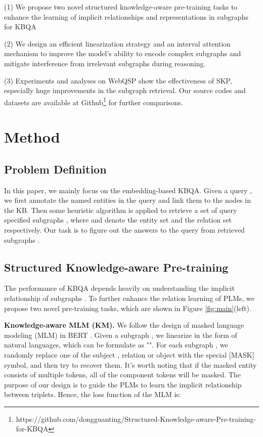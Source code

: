 \documentclass[sigconf,natbib=true,anonymous=False]{acmart}
\begin{document}
(1) We propose two novel structured knowledge-aware pre-training tasks to enhance the learning of implicit relationships and representations in subgraphs for KBQA

(2) We design an efficient linearization strategy and an interval attention mechanism to improve the model's ability to encode complex subgraphs and mitigate interference from irrelevant subgraphs during reasoning.

(3) Experiments and analyses on WebQSP show the effectiveness of SKP, especially huge improvements in the subgraph retrieval. Our source codes and datasets are available at Github\footnote{https://github.com/dongguanting/Structured-Knowledge-aware-Pre-training-for-KBQA} for further comparisons.









\section{Method}
\subsection{Problem Definition}
In this paper, we mainly focus on the embedding-based KBQA. Given a query , we first annotate the named entities in the query and link them to the nodes in the KB. Then some heuristic algorithm is applied to retrieve a set of query specified subgraphs , where  and  denote the entity set and the relation set respectively. Our task is to figure out the answers  to the query  from retrieved subgraphs . 

\subsection{Structured Knowledge-aware Pre-training}
The performance of KBQA depends heavily on understanding the implicit relationship of subgraphs . To further enhance the relation learning of PLMs, we propose two novel pre-training tasks, which are shown in Figure \ref{fig:main}(left).

\textbf{Knowledge-aware MLM (KM).} We follow the design of masked language modeling (MLM) in BERT \cite{devlin2018bert}. Given a subgraph , we linearize  in the form of natural languages, which can be formulate as "".
For each subgraph , we randomly replace one of the subject , relation  or object  with the special [MASK] symbol, and then try to recover them. It's worth noting that if the masked entity consists of multiple tokens, all of the component tokens will be masked.
The purpose of our design is to guide the PLMs to learn the implicit relationship between triplets. Hence, the loss function of the MLM is:
\end{document}
